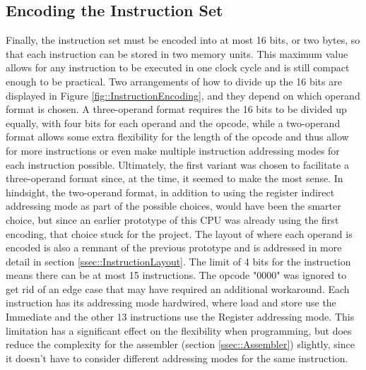 \subsection{Encoding the Instruction Set}
Finally, the instruction set must be encoded into at most 16 bits, or two bytes, so that each instruction can be stored in two memory units. This maximum value allows for any instruction to be executed in one clock cycle and is still compact enough to be practical. Two arrangements of how to divide up the 16 bits are displayed in Figure \ref{fig::InstructionEncoding}, and they depend on which operand format is chosen. A three-operand format requires the 16 bits to be divided up equally, with four bits for each operand and the opcode, while a two-operand format allows some extra flexibility for the length of the opcode and thus allow for more instructions or even make multiple instruction addressing modes for each instruction possible. Ultimately, the first variant was chosen to facilitate a three-operand format since, at the time, it seemed to make the most sense. In hindsight, the two-operand format, in addition to using the register indirect addressing mode as part of the possible choices, would have been the smarter choice, but since an earlier prototype of this CPU was already using the first encoding, that choice stuck for the project. The layout of where each operand is encoded is also a remnant of the previous prototype and is addressed in more detail in section \ref{ssec::InstructionLayout}. The limit of 4 bits for the instruction means there can be at most 15 instructions. The opcode "0000" was ignored to get rid of an edge case that may have required an additional workaround. Each instruction has its addressing mode hardwired, where load and store use the Immediate and the other 13 instructions use the Register addressing mode. This limitation has a significant effect on the flexibility when programming, but does reduce the complexity for the assembler (section \ref{ssec::Assembler}) slightly, since it doesn't have to consider different addressing modes for the same instruction.


